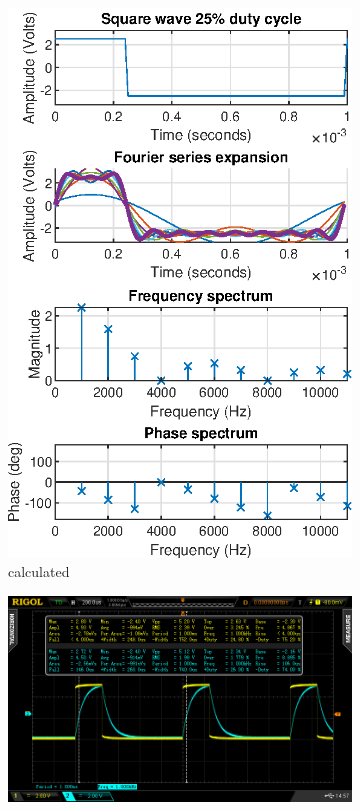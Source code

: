 \documentclass[notitlepage, a4paper, 11pt]{article}
\begin{document}
	\begin{figure}[H]
		\centering
		\begin{subfigure}[][][t]{0.3\textwidth}
			\includegraphics[width=\textwidth]{../Matlab/img/sqr25}
			\caption{calculated}
			\label{fig:calc-signals-a}
		\end{subfigure}
		\quad
		\begin{subfigure}[][][t]{0.3\textwidth}
			\includegraphics[width=\textwidth, trim=85 50 112 45, clip]{../img/osc/DS2_QuickPrint3.png}

\end{subfigure}
\end{figure}
\end{document}
